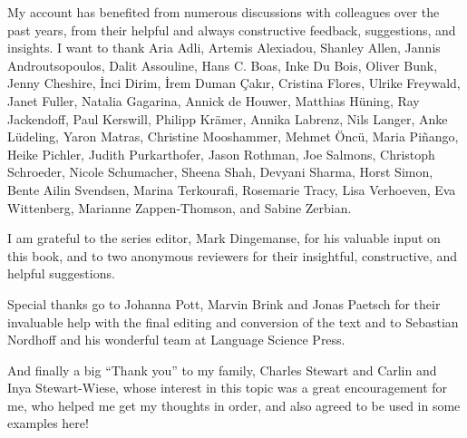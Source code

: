 My account has benefited from numerous discussions with colleagues over the past years, from their helpful and always constructive feedback, suggestions, and insights. I want to thank Aria Adli, Artemis Alexiadou, Shanley Allen, Jannis Androutsopoulos, Dalit Assouline, Hans C. Boas, Inke Du Bois, Oliver Bunk, Jenny Cheshire, İnci Dirim, İrem Duman Çakır, Cristina Flores, Ulrike Freywald, Janet Fuller, Natalia Gagarina, Annick de Houwer, Matthias Hüning, Ray Jackendoff, Paul Kerswill, Philipp Krämer, Annika Labrenz, Nils Langer, Anke Lüdeling, Yaron Matras, Christine Mooshammer, Mehmet Öncü, Maria Piñango, Heike Pichler, Judith Purkarthofer, Jason Rothman, Joe Salmons, Christoph Schroeder, Nicole Schumacher, Sheena Shah, Devyani Sharma, Horst Simon, Bente Ailin Svendsen, Marina Terkourafi, Rosemarie Tracy, Lisa Verhoeven, Eva Wittenberg, Marianne Zappen-Thomson, and Sabine Zerbian.

I am grateful to the series editor, Mark Dingemanse, for his valuable input on this book, and to two anonymous reviewers for their insightful, constructive, and helpful suggestions.

Special thanks go to Johanna Pott, Marvin Brink and Jonas Paetsch for their invaluable help with the final editing and conversion of the text and to Sebastian Nordhoff and his wonderful team at Language Science Press.

And finally a big “Thank you” to my family, Charles Stewart and Carlin and Inya Stewart-Wiese, whose interest in this topic was a great encouragement for me, who helped me get my thoughts in order, and also agreed to be used in some examples here!

